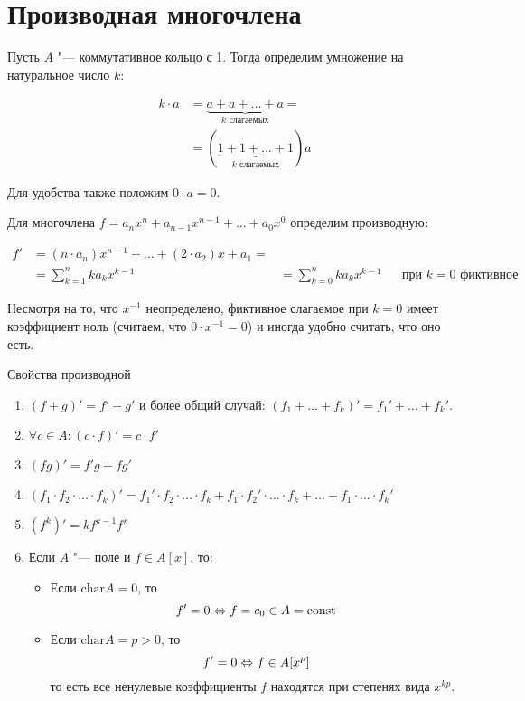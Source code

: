 \section{Производная многочлена}

\begin{Def}
	Пусть $A$ "--- коммутативное кольцо с 1. Тогда определим
	умножение на натуральное число $k$:

	\begin{align*}
	k \cdot a &= \underbrace{a+a+\dots+a}_{k\text{~слагаемых}} = \\
	          &=(\underbrace{1+1+\dots+1}_{k\text{~слагаемых}})a
	\end{align*}

	Для удобства также положим $0\cdot a = 0$.
\end{Def}

\begin{Def}
	Для многочлена $f=a_nx^n+a_{n-1}x^{n-1}+\dots+a_0x^0$ определим производную:

	\begin{align*}
	f' &= (n \cdot a_n) x^{n-1} + \dots + (2\cdot a_2)x + a_1 = \\
	   &= \sum_{k = 1}^nka_kx^{k-1}
	   &= \sum_{k = 0}^nka_kx^{k-1} && \text{при $k=0$ фиктивное слагаемое}
	\end{align*}

	Несмотря на то, что $x^{-1}$ неопределено, фиктивное слагаемое при $k=0$ имеет коэффициент ноль
	(считаем, что $0 \cdot x^{-1} = 0$)	и иногда удобно считать, что оно есть.
\end{Def}

\begin{theorem}{Свойства производной}
	\begin{enumerate}
		\item $(f + g)' = f' + g'$ и более общий случай: $(f_1 + \dots + f_k)' = f_1' + \dots + f_k'$.
		\item $\forall c \in A \colon (c\cdot f)' = c\cdot f'$
		\item $(fg)' = f'g + fg'$
		\item $(f_1 \cdot f_2 \cdot \dots \cdot f_k)' = f_1' \cdot f_2 \cdot \dots \cdot f_k + f_1\cdot f_2'\cdot \dots \cdot f_k + \dots + f_1 \cdot \dots \cdot f_k'$
		\item $(f^k)' = kf^{k - 1}f'$ 
		\item Если $A$ "--- поле и $f \in A[x]$, то:
		\begin{itemize}
			\item Если $\mathrm{char} A = 0$, то
			    \[f' = 0 \Leftrightarrow f = c_0 \in A = \mathrm{const} \]
			\item Если $\mathrm{char} A = p > 0$, то
				\[f' = 0 \Leftrightarrow f \in A[x^p]\]
				то есть все ненулевые коэффициенты $f$ находятся при степенях вида $x^{kp}$.
		\end{itemize}
	\end{enumerate}
\end{theorem} 

